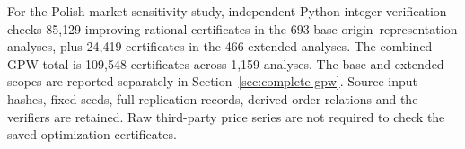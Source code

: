 For the Polish-market sensitivity study{,} independent Python-integer verification checks 85{,}129 improving rational certificates in the 693 base origin--representation analyses{,} plus 24{,}419 certificates in the 466 extended analyses. The combined GPW total is 109{,}548 certificates across 1{,}159 analyses. The base and extended scopes are reported separately in Section~\ref{sec:complete-gpw}. Source-input hashes{,} fixed seeds{,} full replication records{,} derived order relations and the verifiers are retained. Raw third-party price series are not required to check the saved optimization certificates.
